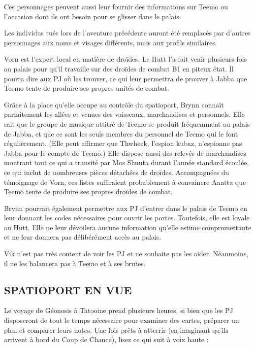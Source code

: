 \documentclass[a4paper,10pt,twoside,twocolumn,openany]{book}
\begin{document}
Ces personnages peuvent aussi leur fournir des informations sur Teemo ou l’occasion dont ils ont besoin pour
se glisser dans le palais.

Les individus tués lors de l’aventure précédente auront
été remplacés par d’autres personnages aux noms et visages différents, mais aux profils similaires.



\subtitle{VORN TEL-OVIS}

Vorn est l’expert local en matière de droïdes. Le Hutt l’a
fait venir plusieurs fois au palais pour qu’il travaille sur
des droïdes de combat B1 en piteux état. Il pourra dire
aux PJ où les trouver, ce qui leur permettra de prouver à
Jabba que Teemo tente de produire ses propres unités
de combat.

\subtitle{LA CONTRÔLEUSE BRYNN}

Grâce à la place qu’elle occupe au contrôle du spatioport, Brynn connaît parfaitement les allées et venues
des vaisseaux, marchandises et personnels. Elle sait
que le groupe de musique attitré de Teemo se produit
fréquemment au palais de Jabba, et que ce sont les
seuls membres du personnel de Teemo qui le font régulièrement. (Elle peut affirmer que Thwheek, l’espion
kubaz, n’espionne pas Jabba pour le compte de Teemo.) Elle dispose aussi des relevés de marchandises
montrant tout ce qui a transité par Mos Shuuta durant
l’année standard écoulée, ce qui inclut de nombreuses
pièces détachées de droïdes. Accompagnées du témoignage de Vorn, ces listes suffiraient probablement
à convaincre Anatta que Teemo tente de produire ses
propres droïdes de combat.

Brynn pourrait également permettre aux PJ d’entrer
dans le palais de Teemo en leur donnant les codes nécessaires pour ouvrir les portes. Toutefois, elle est loyale
au Hutt. Elle ne leur dévoilera aucune information qu’elle
estime compromettante et ne leur donnera pas délibérément accès au palais.

\subtitle{VIK, LE BARMAN DE LA CANTINA}
Vik n’est pas très content de voir les PJ et ne souhaite
pas les aider. Néanmoins, il ne les balancera pas à Teemo
et à ses brutes.

\subsection{SPATIOPORT EN VUE}

Le voyage de Géonosis à Tatooine prend plusieurs
heures, si bien que les PJ disposeront de tout le temps
nécessaire pour examiner des cartes, préparer un plan et
comparer leurs notes. Une fois prêts à atterrir (en imaginant qu’ils arrivent à bord du Coup de Chance), lisez ce
qui suit à voix haute :
\end{document}
